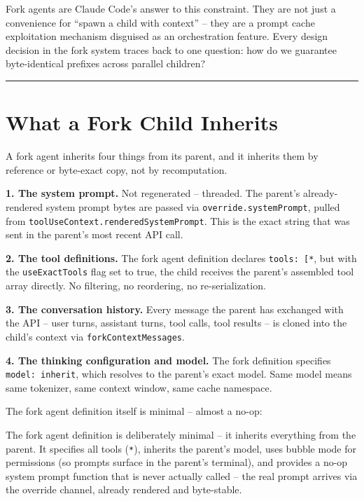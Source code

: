 \documentclass[
  english,
  11pt,
  letterpaper,
]{book}
\begin{document}
Fork agents are Claude Code's answer to this constraint. They are not
just a convenience for ``spawn a child with context'' -- they are a
prompt cache exploitation mechanism disguised as an orchestration
feature. Every design decision in the fork system traces back to one
question: how do we guarantee byte-identical prefixes across parallel
children?

\begin{center}\rule{0.5\linewidth}{0.5pt}\end{center}

\section{What a Fork Child Inherits}\label{what-a-fork-child-inherits}

A fork agent inherits four things from its parent, and it inherits them
by reference or byte-exact copy, not by recomputation.

\textbf{1. The system prompt.} Not regenerated -- threaded. The parent's
already-rendered system prompt bytes are passed via
\texttt{override.systemPrompt}, pulled from
\texttt{toolUseContext.renderedSystemPrompt}. This is the exact string
that was sent in the parent's most recent API call.

\textbf{2. The tool definitions.} The fork agent definition declares
\texttt{tools:\ {[}\textquotesingle{}*\textquotesingle{}{]}}, but with
the \texttt{useExactTools} flag set to true, the child receives the
parent's assembled tool array directly. No filtering, no reordering, no
re-serialization.

\textbf{3. The conversation history.} Every message the parent has
exchanged with the API -- user turns, assistant turns, tool calls, tool
results -- is cloned into the child's context via
\texttt{forkContextMessages}.

\textbf{4. The thinking configuration and model.} The fork definition
specifies \texttt{model:\ \textquotesingle{}inherit\textquotesingle{}},
which resolves to the parent's exact model. Same model means same
tokenizer, same context window, same cache namespace.

The fork agent definition itself is minimal -- almost a no-op:

The fork agent definition is deliberately minimal -- it inherits
everything from the parent. It specifies all tools
(\texttt{\textquotesingle{}*\textquotesingle{}}), inherits the parent's
model, uses bubble mode for permissions (so prompts surface in the
parent's terminal), and provides a no-op system prompt function that is
never actually called -- the real prompt arrives via the override
channel, already rendered and byte-stable.
\end{document}
